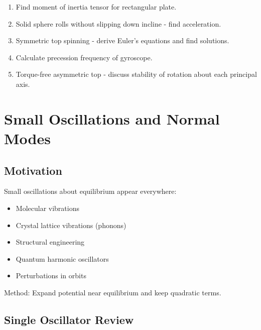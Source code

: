 \documentclass[12pt,a4paper]{article}
\theoremstyle{definition}
\begin{document}
\begin{enumerate}
    \item Find moment of inertia tensor for rectangular plate.
    
    \item Solid sphere rolls without slipping down incline - find acceleration.
    
    \item Symmetric top spinning - derive Euler's equations and find solutions.
    
    \item Calculate precession frequency of gyroscope.
    
    \item Torque-free asymmetric top - discuss stability of rotation about each principal axis.
\end{enumerate}

\newpage
\section{Small Oscillations and Normal Modes}

\subsection{Motivation}

\begin{importantbox}
Small oscillations about equilibrium appear everywhere:
\begin{itemize}
    \item Molecular vibrations
    \item Crystal lattice vibrations (phonons)
    \item Structural engineering
    \item Quantum harmonic oscillators
    \item Perturbations in orbits
\end{itemize}

Method: Expand potential near equilibrium and keep quadratic terms.
\end{importantbox}

\subsection{Single Oscillator Review}
\end{document}
